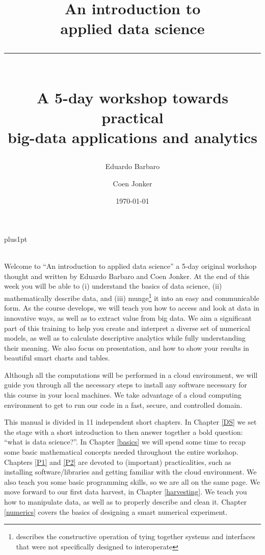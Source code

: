 \documentclass[10pt]{PhDthesisPSnPDF}%
\title{\Huge{An introduction to \\ applied data science} \\ 
\rule{100mm}{5pt} \\
\Large{A 5-day workshop towards practical \\ big-data applications and analytics}}
\author{\Large{Eduardo Barbaro}}
\author{\Large{Coen Jonker}}
\affil{\normalsize Data Scientistists at Mobiquity Inc}
\date{\today}
\begin{document}
\renewcommand\baselinestretch{1}
\baselineskip=14pt plus1pt

\maketitle


 \\

Welcome to ``An introduction to applied data science'' a 5-day original workshop thought and written by Eduardo Barbaro and Coen Jonker. At the end of this week you will be able to (i) understand the basics of data science, (ii) mathematically describe data, and (iii) munge\footnote{describes the constructive operation of tying together systems and interfaces that were not specifically designed to interoperate} it into an easy and communicable form. As the course develops, we will teach you how to access and look at data in innovative ways, as well as to extract value from big data. We aim a significant part of this training to help you create and interpret a diverse set of numerical models, as well as to calculate descriptive analytics while fully understanding their meaning. We also focus on presentation, and how to show your results in beautiful smart charts and tables.

Although all the computations will be performed in a cloud environment, we will guide you through all the necessary steps to install any software necessary for this course in your local machines. We take advantage of a cloud computing environment to get to run our code in a fast, secure, and controlled domain.

This manual is divided in 11 independent short chapters. In Chapter \ref{DS} we set the stage with a short introduction to then answer together a bold question: ``what is data science?''. In Chapter \ref{basics} we will spend some time to recap some basic mathematical concepts needed throughout the entire workshop. Chapters \ref{P1} and \ref{P2} are devoted to (important) practicalities, such as installing software/libraries and getting familiar with the cloud environment. We also teach you some basic programming skills, so we are all on the same page. We move forward to our first data harvest, in Chapter \ref{harvesting}. We teach you how to manipulate data, as well as to properly describe and clean it. Chapter \ref{numerics} covers the basics of designing a smart numerical experiment. 
\end{document}
